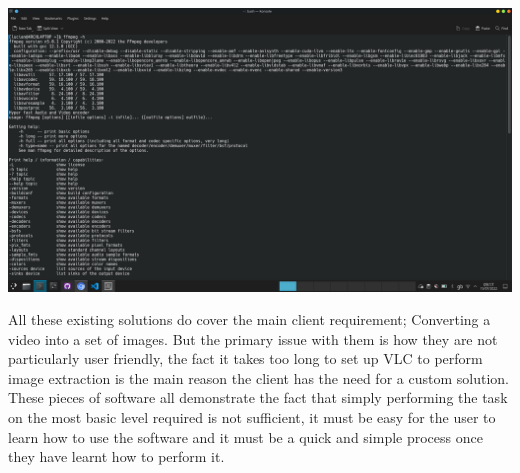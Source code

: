 \documentclass[11pt]{report}
\begin{document}
\begin{minipage}{.5\textwidth}
	\includegraphics[width=1\linewidth]{ffmpeg2}
\end{minipage}
All these existing solutions do cover the main client requirement; Converting a video into a set of images. But the primary issue with them is how they are not particularly user friendly, the fact it takes too long to set up VLC to perform image extraction is the main reason the client has the need for a custom solution. These pieces of software all demonstrate the fact that simply performing the task on the most basic level required is not sufficient, it must be easy for the user to learn how to use the software and it must be a quick and simple process once they have learnt how to perform it.
\end{document}
